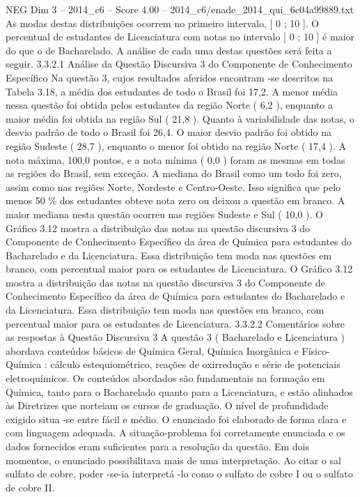 \begin{textsample}{NEG Dim 3 – 2014\_c6 – Score 4.00 – 2014\_c6/enade\_2014\_qui\_6c04a99889.txt}
As modas destas distribuições ocorrem no primeiro intervalo, [ 0 ; 10 ].
O percentual de estudantes de Licenciatura com notas no intervalo [ 0 ; 10 ] é maior do que o de Bacharelado.
A análise de cada uma destas questões será feita a seguir. 3.3.2.1 Análise da Questão Discursiva 3 do Componente de Conhecimento Específico Na questão 3, cujos resultados aferidos encontram -se descritos na Tabela 3.18, a média dos estudantes de todo o Brasil foi 17,2.
A menor média nessa questão foi obtida pelos estudantes da região Norte ( 6,2 ), enquanto a maior média foi obtida na região Sul ( 21,8 ).
Quanto à variabilidade das notas, o desvio padrão de todo o Brasil foi 26,4.
O maior desvio padrão foi obtido na região Sudeste ( 28,7 ), enquanto o menor foi obtido na região Norte ( 17,4 ).
A nota máxima, 100,0 pontos, e a nota mínima ( 0,0 ) foram as mesmas em todas as regiões do Brasil, sem exceção.
A mediana do Brasil como um todo foi zero, assim como nas regiões Norte, Nordeste e Centro-Oeste.
Isso significa que pelo menos 50 \% dos estudantes obteve nota zero ou deixou a questão em branco.
A maior mediana nesta questão ocorreu nas regiões Sudeste e Sul ( 10,0 ).
O Gráfico 3.12 mostra a distribuição das notas na questão discursiva 3 do Componente de Conhecimento Específico da área de Química para estudantes do Bacharelado e da Licenciatura.
Essa distribuição tem moda nas questões em branco, com percentual maior para os estudantes de Licenciatura.
O Gráfico 3.12 mostra a distribuição das notas na questão discursiva 3 do Componente de Conhecimento Específico da área de Química para estudantes do Bacharelado e da Licenciatura.
Essa distribuição tem moda nas questões em branco, com percentual maior para os estudantes de Licenciatura. 3.3.2.2 Comentários sobre as respostas à Questão Discursiva 3 A questão 3 ( Bacharelado e Licenciatura ) abordava conteúdos básicos de Química Geral, Química Inorgânica e Físico-Química : cálculo estequiométrico, reações de oxirredução e série de potenciais eletroquímicos.
Os conteúdos abordados são fundamentais na formação em Química, tanto para o Bacharelado quanto para a Licenciatura, e estão alinhados às Diretrizes que norteiam os cursos de graduação.
O nível de profundidade exigido situa -se entre fácil e médio.
O enunciado foi elaborado de forma clara e com linguagem adequada.
A situação-problema foi corretamente enunciada e os dados fornecidos eram suficientes para a resolução da questão.
Em dois momentos, o enunciado possibilitava mais de uma interpretação.
Ao citar o sal sulfato de cobre, poder -se-ia interpretá -lo como o sulfato de cobre I ou o sulfato de cobre II.

\end{textsample}
